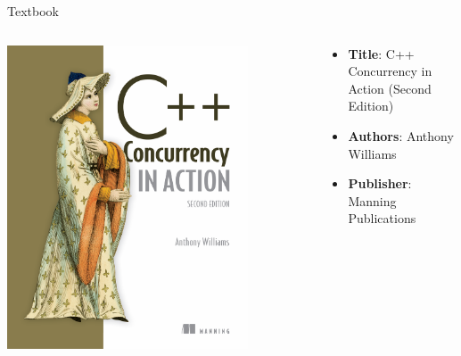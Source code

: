 \begin{frame}[fragile]{ Textbook}

	\begin{columns}
		\begin{column}{0.4\textwidth}
			\begin{center}
				\includegraphics[width=0.8\textwidth]{day8_pm/img/1-ccia}
			\end{center}

		\end{column}
		\begin{column}{0.6\textwidth}
			\begin{itemize}
				\item \textbf{Title}: C++ Concurrency in Action (Second Edition)
				\item \textbf{Authors}: Anthony Williams
				\item \textbf{Publisher}: Manning Publications
			\end{itemize}
		\end{column}
	\end{columns}
\end{frame}

